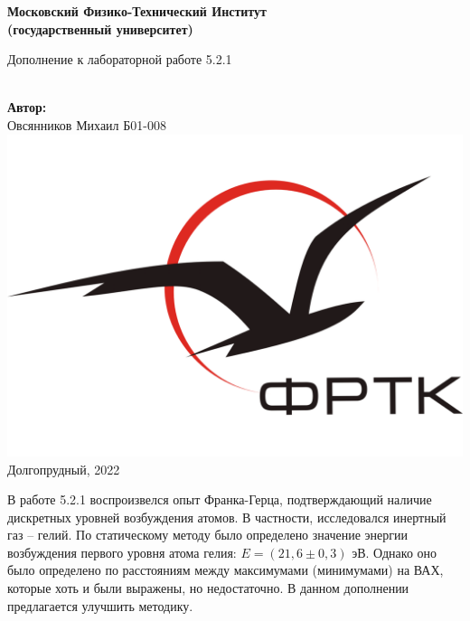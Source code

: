 
\newcommand{\tocsection}[1]{\section*{#1} \addcontentsline{toc}{section}{#1}}
\renewcommand{\cftsecleader}{\cftdotfill{\cftdotsep}}




\newcommand{\HRule}{\rule{\linewidth}{0.7mm}} %


\begin{center}
	\large\textbf{Московский Физико-Технический Институт}\\
	\large\textbf{(государственный университет)}
	
	\vfill
	
	
	
	\Large Дополнение к лабораторной работе 5.2.1

	
	\ \\
	\textbf{\large Автор:} \\	
	\large Овсянников Михаил Б01-008\\
	\vfill
	\hspace*{-0.8 cm}\includegraphics[width=100 pt]{./Include/frkt_logo.pdf}\\
	\large Долгопрудный, 2022
\end{center}

\thispagestyle{empty}

\newpage
\setcounter{page}{2}
\fancyfoot[c]{\thepage}


В работе 5.2.1 воспроизвелся опыт Франка-Герца, подтверждающий наличие дискретных уровней возбуждения атомов. В частности, исследовался инертный газ -- гелий. По статическому методу было определено значение энергии возбуждения первого уровня атома гелия: $E = (21,6 \pm 0,3)$ эВ. Однако оно было определено по расстояниям между максимумами (минимумами) на ВАХ, которые хоть и были выражены, но недостаточно. В данном дополнении предлагается улучшить методику.

